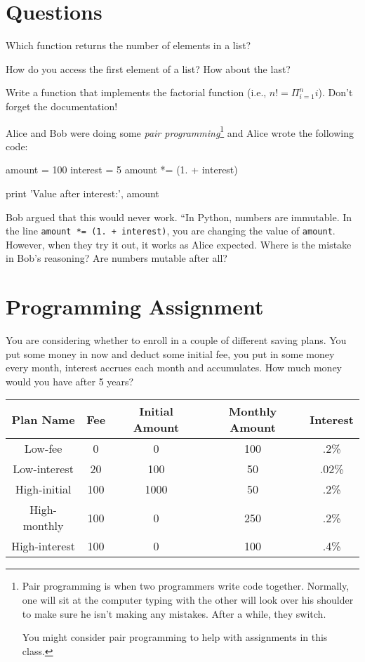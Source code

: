

\chapter{Questions}

\question
Which function returns the number of elements in a list?

\question
How do you access the first element of a list? How about the last?

\question
Write a function that implements the factorial function (i.e., $n! = \Pi_{i=1}^n i$). Don't forget the documentation!

\question
Alice and Bob were doing some \textit{pair programming}\footnote{Pair programming is when two programmers write code together. Normally, one will sit at the computer typing with the other will look over his shoulder to make sure he isn't making any mistakes. After a while, they switch.

You might consider pair programming to help with assignments in this class.} and Alice wrote the following code:

\begin{python}
amount = 100
interest = 5
amount *= (1. + interest)

print 'Value after interest:', amount 
\end{python}

Bob argued that this would never work. ``In Python, numbers are immutable. In the line \lstinline{amount *= (1. + interest)}, you are changing the value of \lstinline{amount}. However, when they try it out, it works as Alice expected. Where is the mistake in Bob's reasoning? Are numbers mutable after all?

\chapter{Programming Assignment}

You are considering whether to enroll in a couple of different saving plans. You put some money in now and deduct some initial fee, you put in some money every month, interest accrues each month and accumulates. How much money would you have after 5 years?

\begin{tabular}{ccccc}
\toprule
Plan Name & Fee & Initial Amount & Monthly Amount & Interest \\
\midrule
Low-fee & 0 & 0 & 100 & .2\% \\
Low-interest & 20 & 100 & 50 & .02\% \\
High-initial & 100 & 1000 & 50 & .2\% \\
High-monthly & 100 & 0 & 250 & .2\% \\
High-interest & 100 & 0 & 100 & .4\% \\
\bottomrule
\end{tabular}




